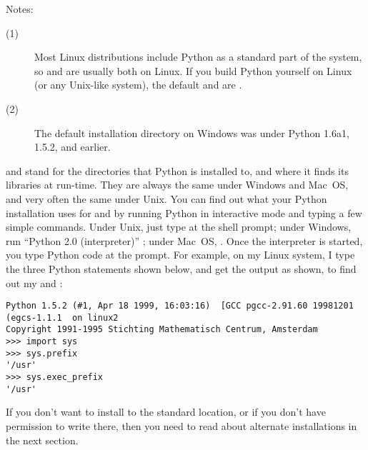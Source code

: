 \documentclass{howto}
\begin{document}
\noindent Notes:
\begin{description}
\item[(1)] Most Linux distributions include Python as a standard part of
  the system, so  and  are usually
  both  on Linux.  If you build Python yourself on Linux (or
  any Unix-like system), the default  and
   are .
\item[(2)] The default installation directory on Windows was
   under
  Python 1.6a1, 1.5.2, and earlier.
\end{description}

 and  stand for the directories
that Python is installed to, and where it finds its libraries at
run-time.  They are always the same under Windows and Mac~OS, and very
often the same under Unix.  You can find out what your Python
installation uses for  and  by
running Python in interactive mode and typing a few simple commands.
Under Unix, just type  at the shell prompt; under Windows,
run ``Python 2.0 (interpreter)'' ; under Mac~OS, .
Once the interpreter is started, you type Python code at the
\samp{>>> } prompt.  For example, on my Linux system, I type the three
Python statements shown below, and get the output as shown, to find
out my  and :

\begin{verbatim}
Python 1.5.2 (#1, Apr 18 1999, 16:03:16)  [GCC pgcc-2.91.60 19981201 (egcs-1.1.1  on linux2
Copyright 1991-1995 Stichting Mathematisch Centrum, Amsterdam
>>> import sys
>>> sys.prefix
'/usr'
>>> sys.exec_prefix
'/usr'
\end{verbatim}

If you don't want to install to the standard location, or if you don't
have permission to write there, then you need to read about alternate
installations in the next section.



\newcommand{\installscheme}[8]
  {\begin{tableiii}{lll}{textrm}
          {Type of file}
          {Installation Directory}
          {Override option}
     \lineiii{pure module distribution}
             {\filevar{#1}\filenq{#2}}
             {\longprogramopt{install-purelib}}
     \lineiii{non-pure module distribution}
             {\filevar{#3}\filenq{#4}}
             {\longprogramopt{install-platlib}}
     \lineiii{scripts}
             {\filevar{#5}\filenq{#6}}
             {\longprogramopt{install-scripts}}
     \lineiii{data}
             {\filevar{#7}\filenq{#8}}
             {\longprogramopt{install-data}}
   \end{tableiii}}
\end{document}
